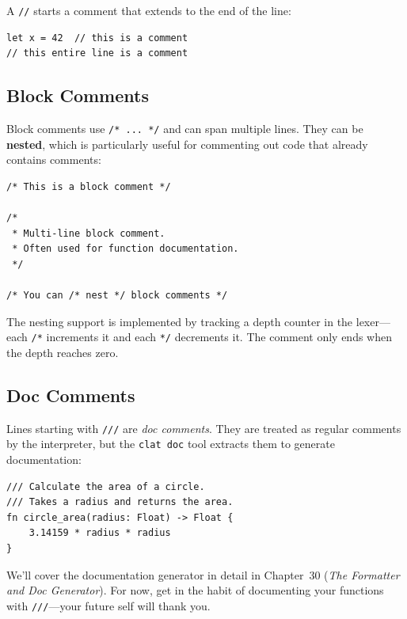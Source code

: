 A \lstinline|//| starts a comment that extends to the end of the line:

\begin{lstlisting}[language=Lattice, caption={Line comments}]
let x = 42  // this is a comment
// this entire line is a comment
\end{lstlisting}

\subsection{Block Comments}\label{subsec:block-comments}

Block comments use \lstinline|/* ... */| and can span multiple lines.
They can be \textbf{nested}, which is particularly useful for commenting out code that already contains comments:

\begin{lstlisting}[language=Lattice, caption={Block comments (nestable)}]
/* This is a block comment */

/*
 * Multi-line block comment.
 * Often used for function documentation.
 */

/* You can /* nest */ block comments */
\end{lstlisting}

The nesting support is implemented by tracking a depth counter in the lexer---each \lstinline|/*| increments it and each \lstinline|*/| decrements it.
The comment only ends when the depth reaches zero.

\subsection{Doc Comments}\label{subsec:doc-comments}

Lines starting with \lstinline|///| are \emph{doc comments}.
They are treated as regular comments by the interpreter, but the \lstinline|clat doc| tool extracts them to generate documentation:

\begin{lstlisting}[language=Lattice, caption={Doc comments}]
/// Calculate the area of a circle.
/// Takes a radius and returns the area.
fn circle_area(radius: Float) -> Float {
    3.14159 * radius * radius
}
\end{lstlisting}

We'll cover the documentation generator in detail in Chapter~30 (\emph{The Formatter and Doc Generator}).
For now, get in the habit of documenting your functions with \lstinline|///|---your future self will thank you.

